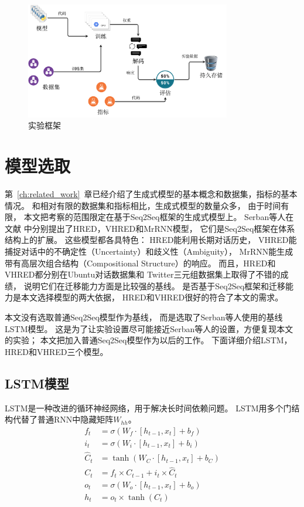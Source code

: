 \begin{figure}[H]
    \centering
    \includegraphics[width=0.8\textwidth]{figure/drawio/eval_v4.pdf}
    \caption{实验框架}
    \label{fig:framework}
\end{figure}

\section{模型选取}\label{sec:model_selection}
第~\ref{ch:related_work}~章已经介绍了生成式模型的基本概念和数据集，指标的基本情况。
和相对有限的数据集和指标相比，生成式模型的数量众多，
由于时间有限，
本文把考察的范围限定在基于Seq2Seq框架的生成式模型上。
Serban等人在文献\cite{HRED,VHRED,MrRNN}
中分别提出了HRED，VHRED和MrRNN模型，
它们是Seq2Seq框架在体系结构上的扩展。
这些模型都各具特色：
HRED能利用长期对话历史，
VHRED能捕捉对话中的不确定性（Uncertainty）和歧义性（Ambiguity），
MrRNN能生成带有高层次组合结构（Compositional Structure）的响应。
而且，HRED和VHRED都分别在Ubuntu对话数据集和
Twitter三元组数据集上取得了不错的成绩，
说明它们在迁移能力方面是比较强的基线。
是否基于Seq2Seq框架和迁移能力是本文选择模型的两大依据，
HRED和VHRED很好的符合了本文的需求。

本文没有选取普通Seq2Seq模型作为基线，
而是选取了Serban等人使用的基线LSTM模型。
这是为了让实验设置尽可能接近Serban等人的设置，方便复现本文的实验；
本文把加入普通Seq2Seq模型作为以后的工作。
下面详细介绍LSTM，HRED和VHRED三个模型。

\subsection{LSTM模型}\label{subsec:LSTM}
LSTM是一种改进的循环神经网络，用于解决长时间依赖问题。
LSTM用多个门结构代替了普通RNN中隐藏矩阵$W_{hh}$。
\begin{align}
    f_t &= \sigma(W_f \cdot [h_{t-1}, x_t] + b_f) \\
    i_t &= \sigma(W_i \cdot [h_{t-1}, x_t] + b_i) \\
    \hat{C}_t &= \tanh(W_C \cdot [h_{t-1}, x_t] + b_C) \\
    C_t &= f_t \times C_{t-1} + i_t \times \hat{C}_t \\
    o_t &= \sigma(W_o \cdot [h_{t-1}, x_t] + b_o) \\
    h_t &= o_t \times \tanh(C_t)
    \label{eqn:LSTM_formula}
\end{align}

